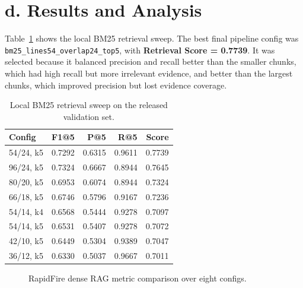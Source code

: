 \documentclass[11pt,twocolumn]{article}
\newcommand{\code}[1]{\texttt{\footnotesize #1}}
\newcommand{\metric}[1]{\textbf{#1}}
\begin{document}
\section{d. Results and Analysis}

Table~\ref{tab:bm25-results} shows the local BM25 retrieval sweep. The best final pipeline config was \code{bm25\_lines54\_overlap24\_top5}, with \metric{Retrieval Score = 0.7739}. It was selected because it balanced precision and recall better than the smaller chunks, which had high recall but more irrelevant evidence, and better than the largest chunks, which improved precision but lost evidence coverage.

\begin{table}[t]
\centering
\scriptsize
\caption{Local BM25 retrieval sweep on the released validation set.}
\label{tab:bm25-results}
\begin{tabular}{lrrrr}
\toprule
Config & F1@5 & P@5 & R@5 & Score \\
\midrule
54/24, k5 & 0.7292 & 0.6315 & 0.9611 & 0.7739 \\
96/24, k5 & 0.7324 & 0.6667 & 0.8944 & 0.7645 \\
80/20, k5 & 0.6953 & 0.6074 & 0.8944 & 0.7324 \\
66/18, k5 & 0.6746 & 0.5796 & 0.9167 & 0.7236 \\
54/14, k4 & 0.6568 & 0.5444 & 0.9278 & 0.7097 \\
54/14, k5 & 0.6531 & 0.5407 & 0.9278 & 0.7072 \\
42/10, k5 & 0.6449 & 0.5304 & 0.9389 & 0.7047 \\
36/12, k5 & 0.6330 & 0.5037 & 0.9667 & 0.7011 \\
\bottomrule
\end{tabular}
\end{table}

\begin{figure}[t]
\centering
{}
\caption{RapidFire dense RAG metric comparison over eight configs.}
\label{fig:rapidfire-bars}
\end{figure}
\end{document}
